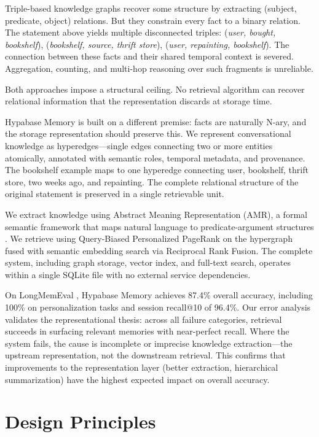 \documentclass[11pt,a4paper]{article}
\begin{document}
Triple-based knowledge graphs recover some structure by extracting (subject, predicate, object) relations. But they constrain every fact to a binary relation. The statement above yields multiple disconnected triples: (\textit{user, bought, bookshelf}), (\textit{bookshelf, source, thrift store}), (\textit{user, repainting, bookshelf}). The connection between these facts and their shared temporal context is severed. Aggregation, counting, and multi-hop reasoning over such fragments is unreliable.

Both approaches impose a structural ceiling. No retrieval algorithm can recover relational information that the representation discards at storage time.

Hypabase Memory is built on a different premise: facts are naturally N-ary, and the storage representation should preserve this. We represent conversational knowledge as hyperedges---single edges connecting two or more entities atomically, annotated with semantic roles, temporal metadata, and provenance. The bookshelf example maps to one hyperedge connecting user, bookshelf, thrift store, two weeks ago, and repainting. The complete relational structure of the original statement is preserved in a single retrievable unit.

We extract knowledge using Abstract Meaning Representation (AMR), a formal semantic framework that maps natural language to predicate-argument structures \citep{banarescu2013amr}. We retrieve using Query-Biased Personalized PageRank on the hypergraph fused with semantic embedding search via Reciprocal Rank Fusion. The complete system, including graph storage, vector index, and full-text search, operates within a single SQLite file with no external service dependencies.

On LongMemEval \citep{wang2025longmemeval}, Hypabase Memory achieves 87.4\% overall accuracy, including 100\% on personalization tasks and session recall@10 of 96.4\%. Our error analysis validates the representational thesis: across all failure categories, retrieval succeeds in surfacing relevant memories with near-perfect recall. Where the system fails, the cause is incomplete or imprecise knowledge extraction---the upstream representation, not the downstream retrieval. This confirms that improvements to the representation layer (better extraction, hierarchical summarization) have the highest expected impact on overall accuracy.

\section{Design Principles}
\end{document}
